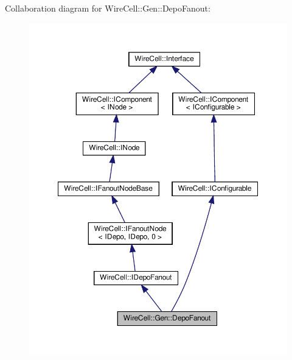 Collaboration diagram for Wire\+Cell\+:\+:Gen\+:\+:Depo\+Fanout\+:
\nopagebreak
\begin{figure}[H]
\begin{center}
\leavevmode
\includegraphics[width=350pt]{class_wire_cell_1_1_gen_1_1_depo_fanout__coll__graph}
\end{center}
\end{figure}
